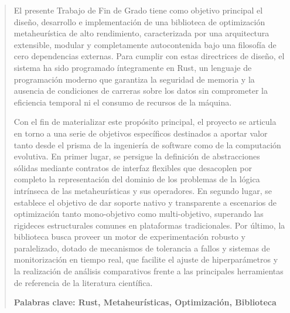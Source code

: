 \documentclass[12pt,a4paper,twoside,openright]{book}
\begin{document}
\renewcommand{\abstractname}{Resumen}
\begin{abstract}
El presente Trabajo de Fin de Grado tiene como objetivo principal el diseño, desarrollo e implementación de una biblioteca de optimización metaheurística de alto rendimiento, caracterizada por una arquitectura extensible, modular y completamente autocontenida bajo una filosofía de cero dependencias externas. Para cumplir con estas directrices de diseño, el sistema ha sido programado íntegramente en Rust, un lenguaje de programación moderno que garantiza la seguridad de memoria y la ausencia de condiciones de carreras sobre los datos sin comprometer la eficiencia temporal ni el consumo de recursos de la máquina.

Con el fin de materializar este propósito principal, el proyecto se articula en torno a una serie de objetivos específicos destinados a aportar valor tanto desde el prisma de la ingeniería de software como de la computación evolutiva. En primer lugar, se persigue la definición de abstracciones sólidas mediante contratos de interfaz flexibles que desacoplen por completo la representación del dominio de los problemas de la lógica intrínseca de las metaheurísticas y sus operadores. En segundo lugar, se establece el objetivo de dar soporte nativo y transparente a escenarios de optimización tanto mono-objetivo como multi-objetivo, superando las rigideces estructurales comunes en plataformas tradicionales. Por último, la biblioteca busca proveer un motor de experimentación robusto y paralelizado, dotado de mecanismos de tolerancia a fallos y sistemas de monitorización en tiempo real, que facilite el ajuste de hiperparámetros y la realización de análisis comparativos frente a las principales herramientas de referencia de la literatura científica.

\medskip
\noindent\textbf{Palabras clave: Rust, Metaheurísticas, Optimización, Biblioteca} 
\end{abstract}
\end{document}
